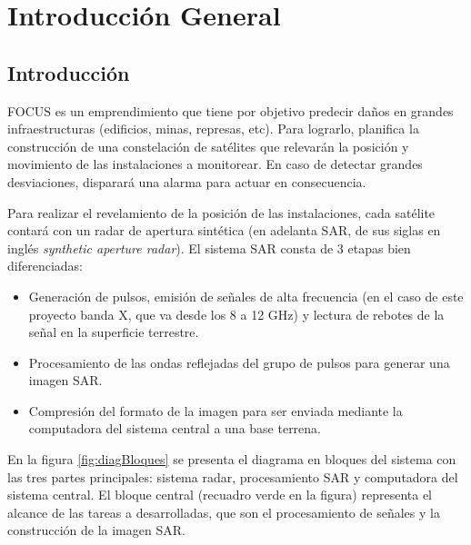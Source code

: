 
\chapter{Introducción General} %

\label{ChapterIntroGral} %


\section{Introducción}

FOCUS es un emprendimiento que tiene por objetivo predecir daños en grandes infraestructuras (edificios, minas, represas, etc). Para lograrlo, planifica la construcción de una constelación de satélites que relevarán la posición y movimiento de las instalaciones a monitorear. En caso de detectar grandes desviaciones, disparará una alarma para actuar en consecuencia.

Para realizar el revelamiento de la posición de las instalaciones, cada satélite contará con un radar de apertura sintética (en adelanta SAR, de sus siglas en inglés \textit{synthetic aperture radar}). El sistema SAR consta de 3 etapas bien diferenciadas:
\begin{itemize}
	\item Generación de pulsos, emisión de señales de alta frecuencia (en el caso de este proyecto banda X, que va desde los 8 a 12 GHz) y lectura de rebotes de la señal en la superficie terrestre.   
	\item Procesamiento de las ondas reflejadas del grupo de pulsos para generar una imagen SAR.
	\item Compresión del formato de la imagen para ser enviada mediante la computadora del sistema central a una base terrena.
\end{itemize}

En la figura \ref{fig:diagBloques} se presenta el diagrama en bloques del sistema  con las tres partes principales: sistema radar, procesamiento SAR y computadora del sistema central. El bloque central (recuadro verde en la figura) representa el alcance de las tareas a desarrolladas, que son el procesamiento de señales y la construcción de la imagen SAR.



